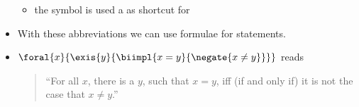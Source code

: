 \documentclass[notes,mh]{mikoslides}
\begin{document}
\begin{module}[id=mathtalk]
\begin{frame}[label=slide.mathtalk]
\begin{itemize}
\begin{definition}[id=mathtalk.def,
      for={conj,disj,negate,foral,foralS,exis,exisS,biimpl,imply,uexis,uexisS,nexis,nexisS}]
\begin{itemize}
        \nlex{$\biimplFN$}
      \item the symbol \nlex{$\implyFN$} is used a as shortcut for 
      \end{itemize}
    \end{definition}
  \item
    \begin{omtext}[title=Observation,id=mathtalk-statements-formulae] 
      With these abbreviations we can use formulae for statements.
   \end{omtext}
  \item 
    \begin{example}[id=implies-reads,for=mathtalk-statements-formulae]
      $\foral{x}{\exis{y}{\biimpl{x=y}{\negate{x\ne y}}}}$ reads
      \begin{quote}
        ``For all $x$, there is a $y$, such that $x=y$, iff (if and only if) it is not the
        case that $x\ne y$.''
      \end{quote}
    \end{example}
  \end{itemize}
\end{frame}
\end{module}
\end{document}
